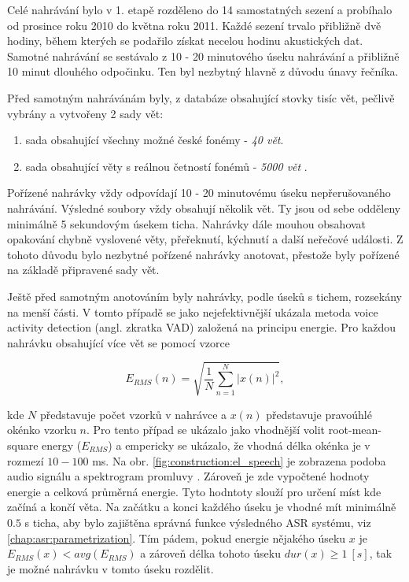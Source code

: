 Celé nahrávání bylo v 1. etapě rozděleno do 14 samostatných sezení a probíhalo od prosince roku 2010 do května roku 2011. Každé sezení trvalo přibližně dvě hodiny, během kterých se podařilo získat necelou hodinu akustických dat. Samotné nahrávání se sestávalo z 10 - 20 minutového úseku nahrávání a přibližně 10 minut dlouhého odpočinku. Ten byl nezbytný hlavně z důvodu únavy řečníka.

Před samotným nahrávánám byly, z databáze obsahující stovky tisíc vět, pečlivě vybrány a vytvořeny 2 sady vět:

\begin{enumerate}
  \item sada obsahující všechny možné české fonémy - \textit{40 vět}.
  \item sada obsahující věty s reálnou četností fonémů - \textit{5000 vět} \cite{Radova2000}.
\end{enumerate}

\noindent Pořízené nahrávky vždy odpovídají 10 - 20 minutovému úseku nepřerušovaného nahrávání. Výsledné soubory vždy obsahují několik vět. Ty jsou od sebe odděleny minimálně 5 sekundovým úsekem ticha. Nahrávky dále mouhou obsahovat opakování chybně vyslovené věty, přeřeknutí, kýchnutí a další neřečové události. Z tohoto důvodu bylo nezbytné pořízené nahrávky anotovat, přestože byly pořízené na základě připravené sady vět.

Ještě před samotným anotováním byly nahrávky, podle úseků s tichem, rozsekány na menší části. V tomto případě se jako nejefektivnější ukázala metoda voice activity detection (angl. zkratka VAD) založená na principu energie. Pro každou nahrávku obsahující více vět se pomocí vzorce

\begin{equation}
  \label{eq:construction:energy}
  E_{RMS}(n) = \sqrt{\frac{1}{N} \sum_{n=1}^{N} \left| x(n) \right|^2},
\end{equation}

\noindent kde $N$ představuje počet vzorků v nahrávce a $x(n)$ představuje pravoúhlé okénko vzorku $n$. Pro tento případ se ukázalo jako vhodnější volit root-mean-square energy ($E_{RMS}$) a empericky se ukázalo, že vhodná délka okénka je v rozmezí $10 - 100$ ms. Na obr. \ref{fig:construction:el_speech} je zobrazena podoba audio signálu a spektrogram promluvy \textit{}. Zároveň je zde vypočtené hodnoty energie a celková průměrná energie. Tyto hodntoty slouží pro určení míst kde začíná a končí věta. Na začátku a konci každého úseku je vhodné mít minimálně $0.5$ s ticha, aby bylo zajištěna správná funkce výsledného ASR systému, viz \ref{chap:asr:parametrization}. Tím pádem, pokud energie nějakého úseku $x$ je $E_{RMS}(x) < avg(E_{RMS})$ a zároveň délka tohoto úseku $dur(x) \geq 1\ [s]$, tak je možné nahrávku v tomto úseku rozdělit.

